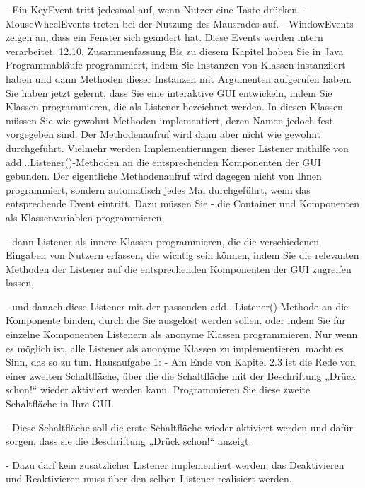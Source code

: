 -	Ein KeyEvent tritt jedesmal auf, wenn Nutzer eine Taste drücken.
-	MouseWheelEvents treten bei der Nutzung des Mausrades auf.
-	WindowEvents zeigen an, dass ein Fenster sich geändert hat. Diese Events werden intern verarbeitet.
12.10.	Zusammenfassung
Bis zu diesem Kapitel haben Sie in Java Programmabläufe programmiert, indem Sie Instanzen von Klassen instanziiert haben und dann Methoden dieser Instanzen mit Argumenten aufgerufen haben.
Sie haben jetzt gelernt, dass Sie eine interaktive GUI entwickeln, indem Sie Klassen programmieren, die als Listener bezeichnet werden. In diesen Klassen müssen Sie wie gewohnt Methoden implementiert, deren Namen jedoch fest vorgegeben sind. Der Methodenaufruf wird dann aber nicht wie gewohnt durchgeführt. Vielmehr werden Implementierungen dieser Listener mithilfe von add...Listener()-Methoden an die entsprechenden Komponenten der GUI gebunden. Der eigentliche Methodenaufruf wird dagegen nicht von Ihnen programmiert, sondern automatisch jedes Mal durchgeführt, wenn das entsprechende Event eintritt.
Dazu müssen Sie
-	die Container und Komponenten als Klassenvariablen programmieren,

-	dann Listener als innere Klassen programmieren, die die verschiedenen Eingaben von Nutzern erfassen, die wichtig sein können, indem Sie die relevanten Methoden der Listener auf die entsprechenden Komponenten der GUI zugreifen lassen,

-	und danach diese Listener mit der passenden add...Listener()-Methode an die Komponente binden, durch die Sie ausgelöst werden sollen.
oder indem Sie für einzelne Komponenten Listenern als anonyme Klassen programmieren. Nur wenn es möglich ist, alle Listener als anonyme Klassen zu implementieren, macht es Sinn, das so zu tun.
Hausaufgabe 1:
-	Am Ende von Kapitel 2.3 ist die Rede von einer zweiten Schaltfläche, über die die Schaltfläche mit der Beschriftung „Drück schon!“ wieder aktiviert werden kann. Programmieren Sie diese zweite Schaltfläche in Ihre GUI.

-	Diese Schaltfläche soll die erste Schaltfläche wieder aktiviert werden und dafür sorgen, dass sie die Beschriftung „Drück schon!“ anzeigt.

-	Dazu darf kein zusätzlicher Listener implementiert werden; das Deaktivieren und Reaktivieren muss über den selben Listener realisiert werden.

